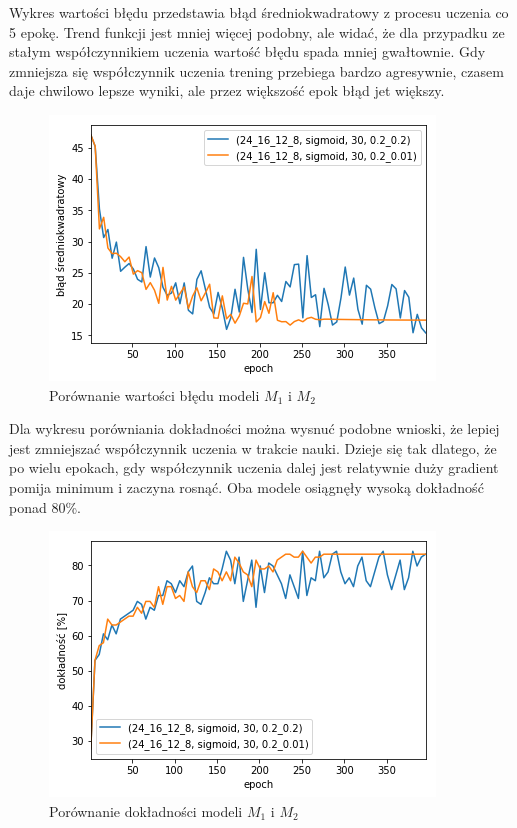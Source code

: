     Wykres wartości błędu przedstawia błąd średniokwadratowy z procesu uczenia co 5 epokę.
    Trend funkcji jest mniej więcej podobny, ale widać, że dla przypadku ze stałym współczynnikiem uczenia wartość błędu spada mniej gwałtownie.
    Gdy zmniejsza się współczynnik uczenia trening przebiega bardzo agresywnie, czasem daje chwilowo lepsze wyniki, ale przez większość epok błąd jet większy.

    \begin{figure}[htp]
        \centering
        \includegraphics[scale=0.8]{./img/lr-error.png}
        \caption{Porównanie wartości błędu modeli $M_1$ i $M_2$}
    \end{figure}

    Dla wykresu porówniania dokładności można wysnuć podobne wnioski, że lepiej jest zmniejszać współczynnik uczenia w trakcie nauki.
    Dzieje się tak dlatego, że po wielu epokach, gdy współczynnik uczenia dalej jest relatywnie duży gradient pomija minimum i zaczyna rosnąć.
    Oba modele osiągnęły wysoką dokładność ponad 80\%.

    \begin{figure}[htp]
        \centering
        \includegraphics[scale=0.8]{./img/lr-accuracy.png}
        \caption{Porównanie dokładności modeli $M_1$ i $M_2$}
    \end{figure}

